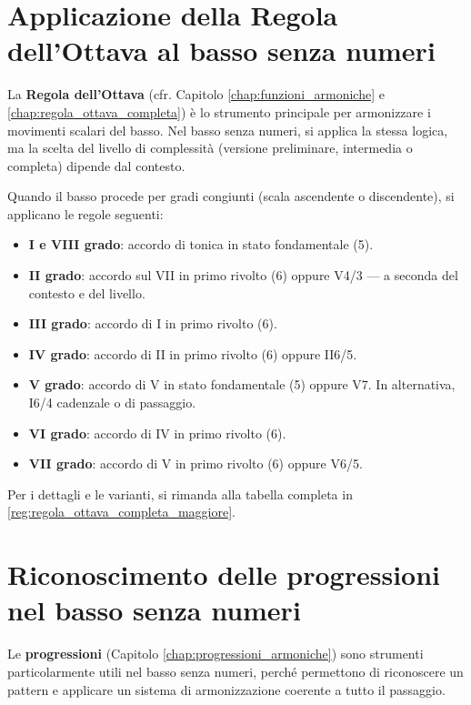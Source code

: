 \section{Applicazione della Regola dell'Ottava al basso senza numeri}
\label{sec:regola_ottava_basso_senza_numeri}

La \textbf{Regola dell'Ottava} (cfr. Capitolo \ref{chap:funzioni_armoniche} e \ref{chap:regola_ottava_completa}) è lo strumento principale per armonizzare i movimenti scalari del basso. Nel basso senza numeri, si applica la stessa logica, ma la scelta del livello di complessità (versione preliminare, intermedia o completa) dipende dal contesto.

\begin{regola}
	\label{reg:applicazione_regola_ottava_basso}
	Quando il basso procede per gradi congiunti (scala ascendente o discendente), si applicano le regole seguenti:
	\begin{itemize}
		\item \textbf{I e VIII grado}: accordo di tonica in stato fondamentale (5).
		\item \textbf{II grado}: accordo sul VII in primo rivolto (6) oppure V4/3 --- a seconda del contesto e del livello.
		\item \textbf{III grado}: accordo di I in primo rivolto (6).
		\item \textbf{IV grado}: accordo di II in primo rivolto (6) oppure II6/5.
		\item \textbf{V grado}: accordo di V in stato fondamentale (5) oppure V7. In alternativa, I6/4 cadenzale o di passaggio.
		\item \textbf{VI grado}: accordo di IV in primo rivolto (6).
		\item \textbf{VII grado}: accordo di V in primo rivolto (6) oppure V6/5.
	\end{itemize}
	Per i dettagli e le varianti, si rimanda alla tabella completa in \ref{reg:regola_ottava_completa_maggiore}.
\end{regola}

\section{Riconoscimento delle progressioni nel basso senza numeri}
\label{sec:progressioni_basso_senza_numeri}

Le \textbf{progressioni} (Capitolo \ref{chap:progressioni_armoniche}) sono strumenti particolarmente utili nel basso senza numeri, perché permettono di riconoscere un pattern e applicare un sistema di armonizzazione coerente a tutto il passaggio.

